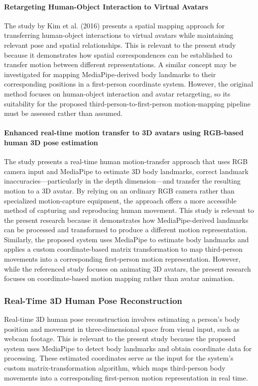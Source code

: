 \documentclass[12pt,a4paper]{article}
\begin{document}
        \paragraph{Retargeting Human-Object Interaction to Virtual Avatars}
        The study by Kim et al. (2016) presents a spatial mapping approach for transferring human-object interactions to virtual avatars while maintaining relevant pose and spatial relationships. This is relevant to the present study because it demonstrates how spatial correspondences can be established to transfer motion between different representations. A similar concept may be investigated for mapping MediaPipe-derived body landmarks to their corresponding positions in a first-person coordinate system. However, the original method focuses on human-object interaction and avatar retargeting, so its suitability for the proposed third-person-to-first-person motion-mapping pipeline must be assessed rather than assumed.

        \paragraph{Enhanced real-time motion transfer to 3D avatars using RGB-based human 3D pose estimation}The study presents a real-time human motion-transfer approach that uses RGB camera input and MediaPipe to estimate 3D body landmarks, correct landmark inaccuracies—particularly in the depth dimension—and transfer the resulting motion to a 3D avatar. By relying on an ordinary RGB camera rather than specialized motion-capture equipment, the approach offers a more accessible method of capturing and reproducing human movement. This study is relevant to the present research because it demonstrates how MediaPipe-derived landmarks can be processed and transformed to produce a different motion representation. Similarly, the proposed system uses MediaPipe to estimate body landmarks and applies a custom coordinate-based matrix transformation to map third-person movements into a corresponding first-person motion representation. However, while the referenced study focuses on animating 3D avatars, the present research focuses on coordinate-based motion mapping rather than avatar animation.

    \subsubsection{Real-Time 3D Human Pose Reconstruction}
    Real-time 3D human pose reconstruction involves estimating a person's body position and movement in three-dimensional space from visual input, such as webcam footage. This is relevant to the present study because the proposed system uses MediaPipe to detect body landmarks and obtain coordinate data for processing. These estimated coordinates serve as the input for the system's custom matrix-transformation algorithm, which maps third-person body movements into a corresponding first-person motion representation in real time.
\end{document}
